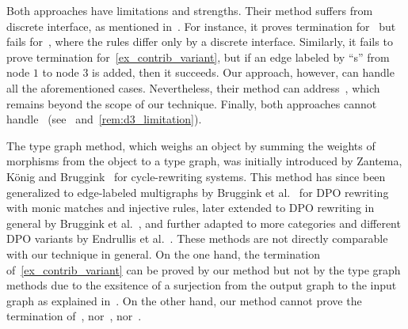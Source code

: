   
Both approaches have limitations and strengths. Their method suffers from discrete interface, as mentioned in~\cite[Example 5.5]{overbeek2024termination_lmcs}. For instance, it proves termination for~\cite[Example 5.5]{overbeek2024termination_lmcs} but fails for~\cite[Example 6.3]{endrullis2024generalized_arxiv_v2}, where the rules differ only by a discrete interface. 
Similarly, it fails to prove termination for~\autoref{ex_contrib_variant}, but if an edge labeled by ``s'' from node $1$ to node $3$ is added, then it succeeds. Our approach, however, can handle all the aforementioned cases. Nevertheless, their method can address~\cite[Example 4.1]{plump1995ontermination}, which remains beyond the scope of our technique. Finally, both approaches cannot handle~\cite[Example D.3]{endrullis2024generalized_arxiv_v2} (see~\cite[Remark 6.2]{overbeek2024termination_lmcs} and~\autoref{rem:d3_limitation}).

The type graph method, which weighs an object by summing the weights of morphisms from the object to a type graph, was initially introduced by Zantema, K{\"o}nig and Bruggink~\cite{zantema2014termination} for cycle-rewriting systems. 
This method has since been generalized to edge-labeled multigraphs by Bruggink et al.~\cite{bruggink2014termination} for DPO rewriting with monic matches and injective rules, later extended to DPO rewriting in general by Bruggink et al.~\cite{bruggink2015proving}, and further adapted to more categories and different DPO variants by Endrullis et al.~\cite{endrullis2024generalized_arxiv_v2}. 
These methods are not directly comparable with our technique in general.
On the one hand, the termination of~\autoref{ex_contrib_variant} can be proved by our method but not by the type graph methods due to the exsitence of a surjection from the output graph to the input graph as explained in~\cite[Example D.4]{endrullis2024generalized_arxiv_v2}. On the other hand, our method cannot prove the termination of~\cite[Example 1, 5 and Ad-hoc Routing Protocol]{bruggink2014termination}, nor~\cite[Example 5, 6]{bruggink2015proving}, nor~\cite[Examples D2 and D3]{endrullis2024generalized_arxiv_v2}.

